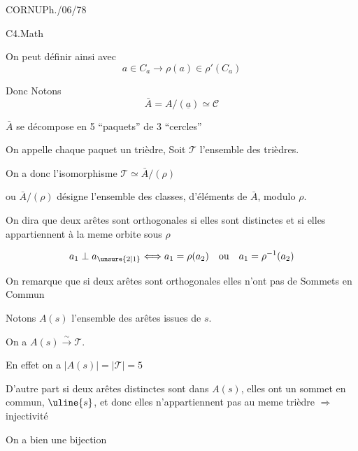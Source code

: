 
CORNU\qquad Ph./06/78

C4.Math


On peut définir ainsi
avec
\[
a\in C_a\longrightarrow\rho(a)\in\rho'(C_a)
\]

Donc Notons 
\[
\bar A=A/(\underline a)\simeq\mathcal C
\]

$\bar A$ se décompose en 5 ``paquets'' de 3 ``cercles''

On appelle chaque paquet un trièdre, Soit $\mathcal T$ l'ensemble des trièdres.

On a donc l'isomorphisme $\mathcal T\simeq\bar A/(\rho)$

ou $\bar A/(\rho)$ désigne l'ensemble des classes, d'éléments de $\bar A$, modulo $\rho$.

On dira que deux arêtes sont orthogonales si elles sont distinctes et si elles appartiennent à la meme orbite sous $\rho$

\uline{}
\[
a_1\perp a_{\unsure{2|1}}
\Longleftrightarrow
a_1=\rho(a_2)\quad\text{ou}\quad a_1=\rho^{-1}(a_2)
\]

On remarque que si deux arêtes sont orthogonales elles n'ont pas de Sommets en Commun

Notons $A(s)$ l'ensemble des arêtes issues de $s$.

On a $A(s)\xrightarrow{\sim}\mathcal T$.

En effet on a $|A(s)|=|\mathcal T|=5$

D'autre part si deux arêtes  distinctes sont dans $A(s)$, elles ont un sommet en commun, $\uline{s}$, et donc elles n'appartiennent pas au meme trièdre $\Rightarrow$ injectivité

On a bien une bijection

